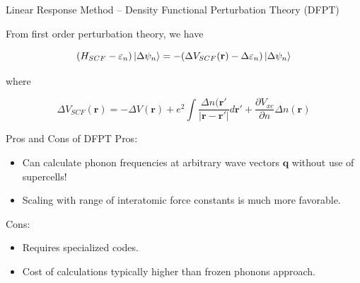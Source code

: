 \documentclass[aspectratio=169]{beamer}
\let \vec \mathbf
\begin{document}
    \begin{frame}{Linear Response Method – Density Functional Perturbation Theory (DFPT)}

        From first order perturbation theory, we have

        \begin{equation*}
        (H_{SCF} - \varepsilon_n)
            \ket{\Delta \psi_n} = -(\Delta V_{SCF}(\vec{r})-\Delta \varepsilon_n) \ket{\Delta \psi_n}
        \end{equation*}

        where

        \begin{equation*}
            \Delta V_{SCF}(\vec{r}) = -\Delta V(\vec{r}) + e^2 \int \frac{ \Delta n(\vec{r}'}{|\vec{r}-\vec{r'}|} d \vec{r'} + \frac{\partial V_{xc}}{\partial n} \Delta n(\vec{r})
        \end{equation*}

    \end{frame}

    \begin{frame}{Pros and Cons of DFPT}
        Pros:
        \begin{itemize}
            \item Can calculate phonon frequencies at arbitrary wave vectors $\vec{q}$ without use of supercells!
            \item Scaling with range of interatomic force constants is much more favorable.
        \end{itemize}

        Cons:
        \begin{itemize}
            \item Requires specialized codes.
            \item Cost of calculations typically higher than frozen phonons approach.
        \end{itemize}

    \end{frame}
\end{document}
